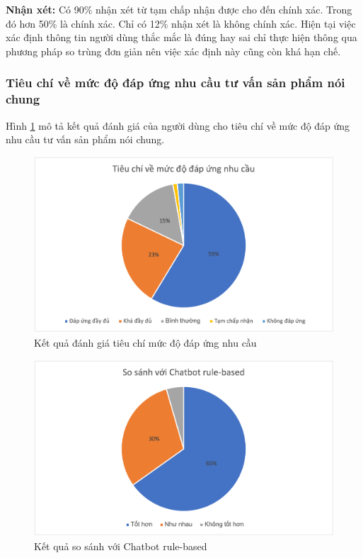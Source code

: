 \textbf{Nhận xét:}
Có 90\% nhận xét từ tạm chấp nhận được cho đến chính xác. Trong đó
hơn 50\% là chính xác. Chỉ có 12\% nhận xét là không chính xác.
Hiện tại việc xác định thông tin người dùng thắc mắc là đúng hay
sai chỉ thực hiện thông qua phương pháp so trùng đơn giản nên việc
xác định này cũng còn khá hạn chế.

\subsubsection{Tiêu chí về mức độ đáp ứng nhu cầu tư vấn sản phẩm
nói chung}
Hình \ref{fig:tieuchi6} mô tả kết quả đánh giá của người dùng cho
tiêu chí về mức độ đáp ứng nhu cầu tư vấn sản phẩm nói chung.

\begin{figure}[ht!]
    \centering
    \includegraphics[scale=0.91]{thesis/chatbot/ketqua/img/tieuchi6.png}
    \caption{Kết quả đánh giá tiêu chí mức độ đáp ứng nhu cầu}
    \label{fig:tieuchi6}
\end{figure}

\begin{figure}[ht!]
    \centering
    \includegraphics[scale=0.91]{thesis/chatbot/ketqua/img/tieuchi6_2.png}
    \caption{Kết quả so sánh với Chatbot rule-based}
    \label{fig:tieuchi62}
\end{figure}

